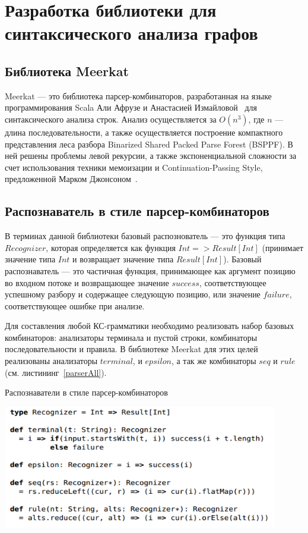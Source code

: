 \section{Разработка библиотеки для синтаксического анализа графов}
\subsection{Библиотека Meerkat}
Meerkat --- это библиотека парсер-комбинаторов, разработанная на языке программирования Scala Али Афрузе и Анастасией Измайловой~\cite{IzmCombinator} для синтаксического анализа строк. Анализ осуществляется за $O(n^3)$, где $n$ --- длина последовательности, а также осуществляется построение компактного представления леса разбора Binarized Shared Packed Parse Forest (BSPPF). В ней решены проблемы левой рекурсии, а также экспоненциальной сложности за счет использования техники мемоизации и Continuation-Passing Style, предложенной Марком Джонсоном~\cite{MemoizationInTopDown}.

\subsection{Распознаватель в стиле парсер-комбинаторов}
В терминах данной библиотеки базовый распознователь --- это функция типа $Recognizer$, которая определяется как функция $Int => Result[Int]$ (принимает значение типа $Int$ и возвращает значение типа $Result[Int]$). Базовый распознаватель --- это частичная функция, принимающее как аргумент позицию во входном потоке и возвращающее значение $success$, соответствующее успешному разбору и содержащее следующую позицию, или значение $failure$, соответствующее ошибке при анализе.

Для составления любой КС-грамматики необходимо реализовать набор базовых комбинаторов: анализаторы терминала и пустой строки, комбинаторы последовательности и правила. В библиотеке Meerkat для этих целей реализованы анализаторы $terminal$, и $epsilon$, а так же комбинаторы $seq$ и $rule$ (см. листининг~\ref{parserAll}).

\begin{listing}
\caption{Распознаватели в стиле парсер-комбинаторов}
\label{parserAll}
\centering
\includegraphics[width=0.9\textwidth]{Smolina/pics/combinators.png}
\end{listing}

